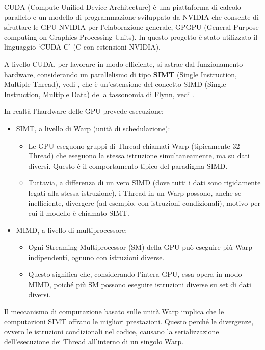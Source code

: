 \documentclass[12pt,a4paper]{report}
\begin{document}
CUDA (Compute Unified Device Architecture) è una
piattaforma di calcolo parallelo e un modello di programmazione sviluppato da NVIDIA che consente di sfruttare le GPU NVIDIA per
l'elaborazione generale, GPGPU (General-Purpose computing on Graphics Processing Units).
In questo progetto è stato utilizzato il linguaggio `CUDA-C' (C con estensioni NVIDIA).

A livello CUDA, per lavorare in modo efficiente, si astrae dal funzionamento hardware, considerando un parallelismo di tipo
\textbf{SIMT} (Single Instruction, Multiple Thread), vedi \cite{NVIDIA2008}, che è un'estensione del concetto SIMD (Single
Instruction, Multiple Data) della tassonomia di Flynn, vedi \cite{Flynn1966}.

In realtà l'hardware delle GPU prevede esecuzione:
\begin{itemize}
  \item SIMT, a livello di Warp (unità di schedulazione):
        \begin{itemize}
          \item Le GPU eseguono gruppi di Thread chiamati Warp (tipicamente 32 Thread) che eseguono la stessa istruzione
                simultaneamente, ma su dati diversi. Questo è il comportamento tipico del paradigma SIMD.
          \item Tuttavia, a differenza di un vero SIMD (dove tutti i dati sono rigidamente legati alla stessa istruzione), i
                Thread in un Warp possono, anche se inefficiente, divergere (ad esempio, con istruzioni condizionali), motivo per
                cui il modello è chiamato SIMT.
        \end{itemize}
  \item MIMD, a livello di multiprocessore:
        \begin{itemize}
          \item Ogni Streaming Multiprocessor (SM) della GPU può eseguire più Warp indipendenti, ognuno con istruzioni diverse.
          \item Questo significa che, considerando l'intera GPU, essa opera in modo MIMD, poiché più SM possono eseguire
                istruzioni diverse su set di dati diversi.
        \end{itemize}
\end{itemize}

Il meccanismo di computazione basato sulle unità Warp implica che le computazioni SIMT offrano le migliori prestazioni.
Questo perché le divergenze, ovvero le istruzioni condizionali nel codice, causano la serializzazione dell'esecuzione dei Thread
all'interno di un singolo Warp.
\end{document}
